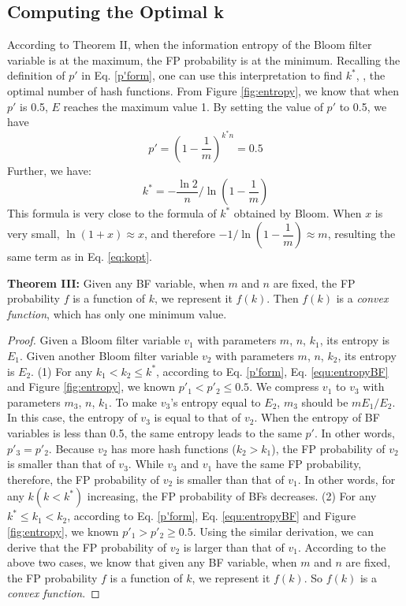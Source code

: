 \presub \subsection{Computing the Optimal k} \postsub
\label{optk}
%
According to Theorem II, when the information entropy of the Bloom filter variable is at the maximum, the FP probability is at the minimum.
%
Recalling the definition of $p'$ in Eq. \ref{p'form}, one can use this interpretation to find $k^*$, \ie, the optimal number of hash functions. 
%
From Figure \ref{fig:entropy}, we know that when $p'$ is 0.5, $E$ reaches the maximum value 1. By setting the value of $p'$ to 0.5, we have
%
\begin{equation}
p'=\left(1-\frac{1}{m}\right)^{k^* n}=0.5
\label{equ:p=0.5}
\end{equation}
%
Further, we have:
\begin{equation}
\label{equ:mykform}
k^*=-\dfrac{\ln 2}{n} / \ln\left(1-\dfrac{1}{m}\right)
\end{equation}
%
This formula is very close to the formula of $k^*$ obtained by Bloom. 
%
When $x$ is very small, $\ln(1+x)\approx x$, and therefore $-1/\ln(1-\dfrac{1}{m}) \approx m$, resulting the same term as in Eq. \ref{eq:kopt}.

\noindent\textbf{Theorem III:} Given any BF variable, when $m$ and $n$ are fixed, the FP probability $f$ is a function of $k$, we represent it $f(k)$. Then $f(k)$ is a \textit{convex function}, which has only one minimum value.

\begin{proof}
Given a Bloom filter variable $v_1$ with parameters $m$, $n$, $k_1$, its entropy is $E_1$.
%
Given another Bloom filter variable $v_2$ with parameters $m$, $n$, $k_2$, its entropy is $E_2$.
%
(1) For any $k_1<k_2\leqslant k^*$, according to Eq. \ref{p'form}, Eq. \ref{equ:entropyBF} and Figure \ref{fig:entropy}, we known $p'_1<p'_2\leqslant 0.5$.
%
We compress $v_1$ to $v_3$ with parameters $m_3$, $n$, $k_1$. 
%
To make $v_3$'s entropy equal to $E_2$, $m_3$ should be $mE_1/E_2$. 
%
In this case, the entropy of $v_3$ is equal to that of $v_2$. 
%
When the entropy of BF variables is less than 0.5, the same entropy leads to the same $p'$. 
%
In other words, $p'_3=p'_2$. 
%
Because $v_2$ has more hash functions ($k_2>k_1$), the FP probability of $v_2$ is smaller than that of $v_3$. 
%
While $v_3$ and $v_1$ have the same FP probability, therefore, the FP probability of $v_2$ is smaller than that of $v_1$.
%
In other words, for any $k (k<k^*)$ increasing, the FP probability of BFs decreases.
%
(2) For any $k^*\leqslant k_1<k_2$, according to Eq. \ref{p'form}, Eq. \ref{equ:entropyBF} and Figure \ref{fig:entropy}, we known $p'_1>p'_2\geqslant 0.5$.
%
Using the similar derivation, we can derive that the FP probability of $v_2$ is larger than that of $v_1$.
%
According to the above two cases, we know that given any BF variable, when $m$ and $n$ are fixed, the FP probability $f$ is a function of $k$, we represent it $f(k)$.  
%
So $f(k)$ is a \textit{convex function}.
\end{proof}